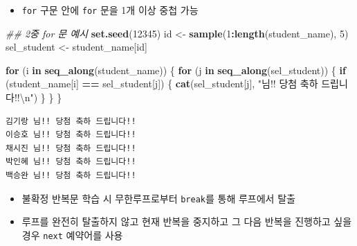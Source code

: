 \documentclass[
  11pt,
]{krantz}
\makeatletter
\newenvironment{Shaded}{\begin{snugshade}}{\end{snugshade}}
\newcommand{\CharTok}[1]{\textcolor[rgb]{0.5,0.5,0.5}{#1}}
\newcommand{\CommentTok}[1]{\textcolor[rgb]{0.37,0.37,0.37}{\textit{#1}}}
\newcommand{\ControlFlowTok}[1]{\textcolor[rgb]{0.27,0.27,0.27}{\textbf{#1}}}
\newcommand{\DecValTok}[1]{\textcolor[rgb]{0.06,0.06,0.06}{#1}}
\newcommand{\KeywordTok}[1]{\textcolor[rgb]{0.27,0.27,0.27}{\textbf{#1}}}
\newcommand{\NormalTok}[1]{#1}
\newcommand{\OperatorTok}[1]{\textcolor[rgb]{0.43,0.43,0.43}{\textbf{#1}}}
\newcommand{\StringTok}[1]{\textcolor[rgb]{0.5,0.5,0.5}{#1}}
\providecommand{\tightlist}{%
  \setlength{\itemsep}{0pt}\setlength{\parskip}{0pt}}
\newenvironment{kframe}{%
\medskip{}
\setlength{\fboxsep}{.8em}
 \def\at@end@of@kframe{}%
 \ifinner\ifhmode%
  \def\at@end@of@kframe{\end{minipage}}%
  \begin{minipage}{\columnwidth}%
 \fi\fi%
 \def\FrameCommand##1{\hskip\@totalleftmargin \hskip-\fboxsep
 \colorbox{shadecolor}{##1}\hskip-\fboxsep
     \hskip-\linewidth \hskip-\@totalleftmargin \hskip\columnwidth}%
 \MakeFramed {\advance\hsize-\width
   \@totalleftmargin\z@ \linewidth\hsize
   \@setminipage}}%
 {\par\unskip\endMakeFramed%
 \at@end@of@kframe}
\newenvironment{rmdblock}[1]
  {
  \begin{itemize}
  \renewcommand{\labelitemi}{
    \raisebox{-.7\height}[0pt][0pt]{
      {\setkeys{Gin}{width=3em,keepaspectratio}\texttt{[image: images/\#1]}}
    }
  }
  \setlength{\fboxsep}{1em}
  \begin{kframe}
  \item
  }
  {
  \end{kframe}
  \end{itemize}
  }
\newenvironment{rmdnote}
  {\begin{rmdblock}{note}}
  {\end{rmdblock}}
\makeatother
\begin{document}
\normalsize

\begin{itemize}
\tightlist
\item
  \texttt{for} 구문 안에 \texttt{for} 문을 1개 이상 중첩 가능
\end{itemize}

\footnotesize

\begin{Shaded}
\begin{Highlighting}[]
\CommentTok{## 2중 for 문 예시}
\KeywordTok{set.seed}\NormalTok{(}\DecValTok{12345}\NormalTok{)}
\NormalTok{id <-}\StringTok{ }\KeywordTok{sample}\NormalTok{(}\DecValTok{1}\OperatorTok{:}\KeywordTok{length}\NormalTok{(student_name), }\DecValTok{5}\NormalTok{)}
\NormalTok{sel_student <-}\StringTok{ }\NormalTok{student_name[id]}

\ControlFlowTok{for}\NormalTok{ (i }\ControlFlowTok{in} \KeywordTok{seq_along}\NormalTok{(student_name)) \{}
  \ControlFlowTok{for}\NormalTok{ (j }\ControlFlowTok{in} \KeywordTok{seq_along}\NormalTok{(sel_student)) \{}
    \ControlFlowTok{if}\NormalTok{ (student_name[i] }\OperatorTok{==}\StringTok{ }\NormalTok{sel_student[j]) \{}
      \KeywordTok{cat}\NormalTok{(sel_student[j], }\StringTok{"님!! 당첨 축하 드립니다!!}\CharTok{\textbackslash{}n}\StringTok{"}\NormalTok{)}
\NormalTok{    \}}
\NormalTok{  \}}
\NormalTok{\}}
\end{Highlighting}
\end{Shaded}

\begin{verbatim}
김기랑 님!! 당첨 축하 드립니다!!
이승호 님!! 당첨 축하 드립니다!!
채시진 님!! 당첨 축하 드립니다!!
박인혜 님!! 당첨 축하 드립니다!!
백승완 님!! 당첨 축하 드립니다!!
\end{verbatim}

\normalsize

\footnotesize

\begin{rmdnote}
\begin{itemize}
\tightlist
\item
  불확정 반복문 학습 시 무한루프로부터 \texttt{break}를 통해 루프에서 탈출
\item
  루프를 완전히 탈출하지 않고 현재 반복을 중지하고 그 다음 반복을 진행하고 싶을 경우 \texttt{next} 예약어를 사용
\end{itemize}
\end{rmdnote}

\normalsize

\footnotesize
\end{document}
